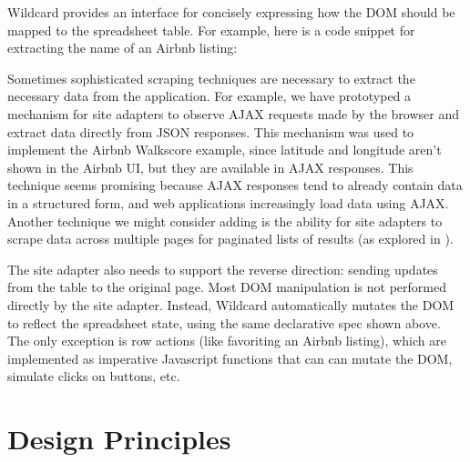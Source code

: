 \documentclass[english,submission]{programming}
\newenvironment{Shaded}{}{}
\newcommand{\CommentTok}[1]{\textcolor[rgb]{0.38,0.63,0.69}{\textit{#1}}}
\newcommand{\FunctionTok}[1]{\textcolor[rgb]{0.02,0.16,0.49}{#1}}
\newcommand{\KeywordTok}[1]{\textcolor[rgb]{0.00,0.44,0.13}{\textbf{#1}}}
\newcommand{\NormalTok}[1]{#1}
\newcommand{\OperatorTok}[1]{\textcolor[rgb]{0.40,0.40,0.40}{#1}}
\newcommand{\SpecialCharTok}[1]{\textcolor[rgb]{0.25,0.44,0.63}{#1}}
\newcommand{\StringTok}[1]{\textcolor[rgb]{0.25,0.44,0.63}{#1}}
\newcommand{\VariableTok}[1]{\textcolor[rgb]{0.10,0.09,0.49}{#1}}
\newcommand{\VerbatimStringTok}[1]{\textcolor[rgb]{0.25,0.44,0.63}{#1}}
\begin{document}
Wildcard provides an interface for concisely expressing how the DOM
should be mapped to the spreadsheet table. For example, here is a code
snippet for extracting the name of an Airbnb listing:

\begin{Shaded}
\end{Shaded}

Sometimes sophisticated scraping techniques are necessary to extract the
necessary data from the application. For example, we have prototyped a
mechanism for site adapters to observe AJAX requests made by the browser
and extract data directly from JSON responses. This mechanism was used
to implement the Airbnb Walkscore example, since latitude and longitude
aren't shown in the Airbnb UI, but they are available in AJAX responses.
This technique seems promising because AJAX responses tend to already
contain data in a structured form, and web applications increasingly
load data using AJAX. Another technique we might consider adding is the
ability for site adapters to scrape data across multiple pages for
paginated lists of results (as explored in \autocite{huynh2006}).

The site adapter also needs to support the reverse direction: sending
updates from the table to the original page. Most DOM manipulation is
not performed directly by the site adapter. Instead, Wildcard
automatically mutates the DOM to reflect the spreadsheet state, using
the same declarative spec shown above. The only exception is row actions
(like favoriting an Airbnb listing), which are implemented as imperative
Javascript functions that can can mutate the DOM, simulate clicks on
buttons, etc.

\hypertarget{sec:design-principles}{%
\section{Design Principles}\label{sec:design-principles}}
\end{document}
